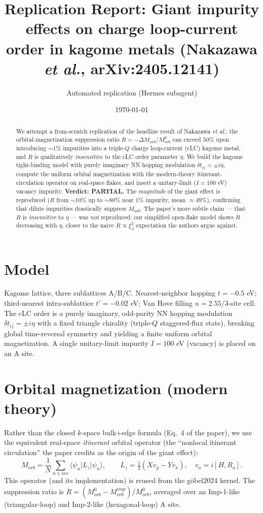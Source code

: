 \documentclass[11pt]{article}
\title{Replication Report: Giant impurity effects on charge loop-current\\
order in kagome metals (Nakazawa \emph{et al.}, arXiv:2405.12141)}
\author{Automated replication (Hermes subagent)}
\date{\today}
\begin{document}
\maketitle

\begin{abstract}
We attempt a from-scratch replication of the headline result of Nakazawa
\emph{et al.}: the orbital-magnetization suppression ratio
$R = -\Delta M_{orb}/M_{orb}^0$ can exceed $50\%$ upon introducing $\sim1\%$
impurities into a triple-$Q$ charge loop-current (cLC) kagome metal, and $R$ is
qualitatively \emph{insensitive} to the cLC order parameter $\eta$. We build the
kagome tight-binding model with purely imaginary NN hopping modulation
$\delta t_{ij}=\pm i\eta$, compute the uniform orbital magnetization with the
modern-theory itinerant-circulation operator on real-space flakes, and insert a
unitary-limit ($I=100$ eV) vacancy impurity. \textbf{Verdict: PARTIAL.} The
\emph{magnitude} of the giant effect is reproduced ($R$ from $\sim10\%$ up to
$\sim80\%$ near $1\%$ impurity, mean $\approx49\%$), confirming that dilute
impurities drastically suppress $M_{orb}$. The paper's more subtle claim --- that
$R$ is \emph{insensitive} to $\eta$ --- was \emph{not} reproduced: our simplified
open-flake model shows $R$ decreasing with $\eta$, closer to the naive
$R\propto\xi_J^2$ expectation the authors argue against.
\end{abstract}

\section{Model}
Kagome lattice, three sublattices A/B/C. Nearest-neighbor hopping $t=-0.5$ eV;
third-nearest intra-sublattice $t'=-0.02$ eV; Van Hove filling
$n=2.55$/3-site cell. The cLC order is a purely imaginary, odd-parity NN hopping
modulation $\delta t_{ij}=\pm i\eta$ with a fixed triangle chirality (triple-$Q$
staggered-flux state), breaking global time-reversal symmetry and yielding a
finite uniform orbital magnetization. A single unitary-limit impurity $I=100$ eV
(vacancy) is placed on an A site.

\section{Orbital magnetization (modern theory)}
Rather than the closed $k$-space bulk+edge formula (Eq.~4 of the paper), we use
the equivalent real-space \emph{itinerant} orbital operator (the ``nonlocal
itinerant circulation'' the paper credits as the origin of the giant effect):
\begin{equation}
M_{orb} = \frac{1}{N}\sum_{n\in\text{occ}}\langle\psi_n| L_z |\psi_n\rangle,
\qquad L_z = \tfrac12(X v_y - Y v_x),\quad v_a = i[H,R_a].
\end{equation}
This operator (and its implementation) is reused from the g\"obel2024 kernel.
The suppression ratio is $R=(M_{orb}^0-M_{orb}^{imp})/M_{orb}^0$, averaged over an
Imp-1-like (triangular-loop) and Imp-2-like (hexagonal-loop) A site.
\end{document}
